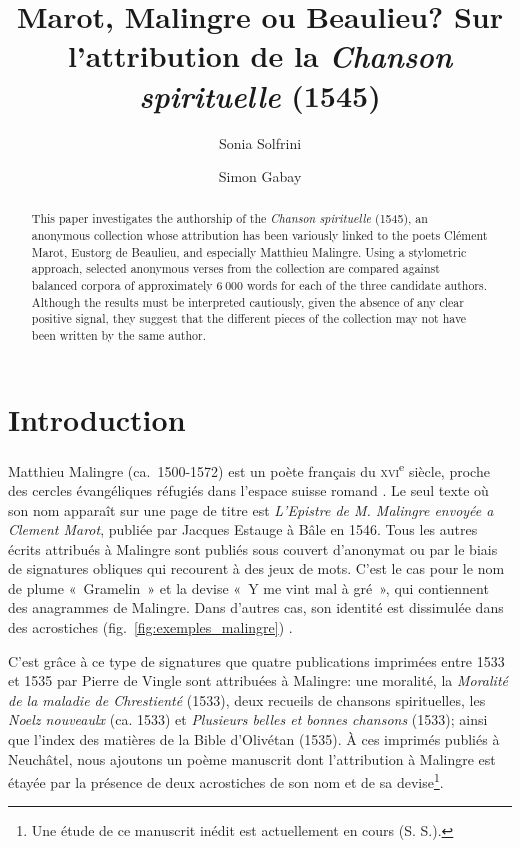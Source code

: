 \documentclass[final, fra]{anthology-ch}
\title{Marot, Malingre ou Beaulieu? Sur l'attribution de la \textit{Chanson spirituelle} (1545)}
\author[1]{Sonia Solfrini}[
  orcid=0009-0009-7367-048X,
  email=sonia.solfrini@unige.ch
]
\author[1]{Simon Gabay}[
  orcid=0000-0001-9094-4475
]
\affiliation{1}{Université de Genève, Suisse}
\begin{document}
\maketitle

\begin{abstract}
This paper investigates the authorship of the \textit{Chanson spirituelle} (1545), an anonymous collection whose attribution has been variously linked to the poets Clément Marot, Eustorg de Beaulieu, and especially Matthieu Malingre. Using a stylometric approach, selected anonymous verses from the collection are compared against balanced corpora of approximately $6~000$ words for each of the three candidate authors. Although the results must be interpreted cautiously, given the absence of any clear positive signal, they suggest that the different pieces of the collection may not have been written by the same author.
\end{abstract}

\section{Introduction}
\label{sec:intro}

Matthieu Malingre (ca.~1500-1572) est un poète français du \textsc{xvi}\textsuperscript{e} siècle, proche des cercles évangéliques réfugiés dans l'espace suisse romand \cite{solfaroli2024pratiche, szczech2019ravir, gross2018theatre, ferrer2012chanson}. Le seul texte où son nom apparaît sur une page de titre est \textit{L'Epistre de M. Malingre envoyée a Clement Marot}, publiée par Jacques Estauge à Bâle en 1546. Tous les autres écrits attribués à Malingre sont publiés sous couvert d'anonymat ou par le biais de signatures obliques qui recourent à des jeux de mots. C'est le cas pour le nom de plume «~Gramelin~» et la devise «~Y me vint mal à gré~», qui contiennent des anagrammes de Malingre. Dans d'autres cas, son identité est dissimulée dans des acrostiches 
(fig.~\ref{fig:exemples_malingre}) 
\cite{gross2007acrostiches,bodenmann_lauteur_2009}. 

C'est grâce à ce type de signatures que quatre publications imprimées entre 1533 et 1535 par Pierre de Vingle sont attribuées à Malingre: une moralité, la \textit{Moralité de la maladie de Chrestienté} (1533), deux recueils de chansons spirituelles, les \textit{Noelz nouveaulx} (ca. 1533) et \textit{Plusieurs belles et bonnes chansons} (1533); ainsi que l'index des matières de la Bible d'Olivétan (1535). À ces imprimés publiés à Neuchâtel, nous ajoutons un poème manuscrit dont l'attribution à Malingre est étayée par la présence de deux acrostiches de son nom et de sa devise\footnote{Une étude de ce manuscrit inédit est actuellement en cours (S. S.).}.
\end{document}
